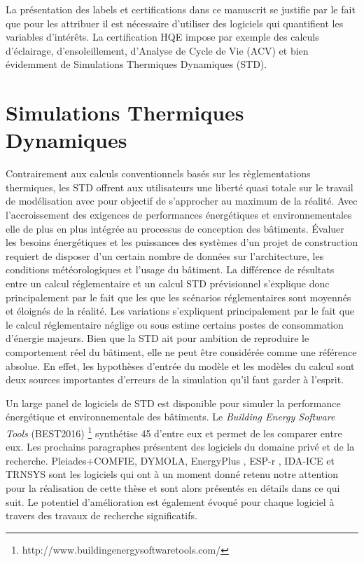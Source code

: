 La présentation des labels et certifications dans ce manuscrit se justifie par le fait que pour les attribuer il est nécessaire d'utiliser des logiciels qui quantifient les variables d'intérêts. La certification HQE impose par exemple des calculs d'éclairage, d'ensoleillement, d'Analyse de Cycle de Vie (ACV) et bien évidemment de Simulations Thermiques Dynamiques (STD).

\section{Simulations Thermiques Dynamiques}

Contrairement aux calculs conventionnels basés sur les règlementations thermiques, les STD offrent aux utilisateurs une liberté quasi totale sur le travail de modélisation avec pour objectif de s'approcher au maximum de la réalité. Avec l'accroissement des exigences de performances énergétiques et environnementales elle de plus en plus intégrée au processus de conception des bâtiments. Évaluer les besoins énergétiques et les puissances des systèmes d'un projet de construction requiert de disposer d'un certain nombre de données sur l'architecture, les conditions météorologiques et l'usage du bâtiment. La différence de résultats entre un calcul réglementaire et un calcul STD prévisionnel s'explique donc principalement par le fait que les que les scénarios réglementaires sont moyennés et éloignés de la réalité. Les variations s'expliquent principalement par le fait que le calcul réglementaire néglige ou sous estime certains postes de consommation d'énergie majeurs. Bien que la STD ait pour ambition de reproduire le comportement réel du bâtiment, elle ne peut être considérée comme une référence absolue. En effet, les hypothèses d'entrée du modèle et les modèles du calcul sont deux sources importantes d'erreurs de la simulation qu'il faut garder à l'esprit.

Un large panel de logiciels de STD est disponible pour simuler la performance énergétique et environnementale des bâtiments. Le \textit{Building Energy Software Tools} (BEST2016) \footnote{http://www.buildingenergysoftwaretools.com/} synthétise 45 d'entre eux et permet de les comparer entre eux. Les prochains paragraphes présentent des logiciels du domaine privé et de la recherche. Pleiades+COMFIE, DYMOLA, EnergyPlus , ESP-r , IDA-ICE et TRNSYS sont les logiciels qui ont à un moment donné retenu notre attention pour la réalisation de cette thèse et sont alors présentés en détails dans ce qui suit. Le potentiel d'amélioration est également évoqué pour chaque logiciel à travers des travaux de recherche significatifs.

